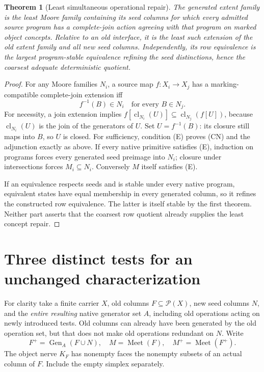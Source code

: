 \documentclass[11pt]{article}
\newtheorem{theorem}{Theorem}[section]
\theoremstyle{definition}\newtheorem{definition}[theorem]{Definition}
\theoremstyle{remark}\newtheorem{remark}[theorem]{Remark}
\newcommand{\Pow}{\mathcal P}
\newcommand{\Gen}{\operatorname{Gen}}
\newcommand{\Meet}{\operatorname{Meet}}
\newcommand{\cl}{\operatorname{cl}}
\begin{document}
\begin{theorem}[Least simultaneous operational repair]
The generated extent family is the least Moore family containing its
seed columns for which every admitted source program has a
complete-join action agreeing with that program on marked object
concepts. Relative to an old interface, it is the least such extension
of the old extent family and all new seed columns. Independently, its
row equivalence is the largest program-stable equivalence refining the
seed distinctions, hence the coarsest adequate deterministic quotient.
\end{theorem}
\begin{proof}
For any Moore families $N_i$, a source map $f:X_i\to X_j$ has a
marking-compatible complete-join extension iff
\[
 f^{-1}(B)\in N_i\quad\text{for every }B\in N_j.\tag{E}
\]
For necessity, a join extension implies
$f[\cl_{N_i}(U)]\subseteq\cl_{N_j}(f[U])$, because
$\cl_{N_i}(U)$ is the join of the generators of $U$. Set
$U=f^{-1}(B)$: its closure still maps into $B$, so $U$ is closed.
For sufficiency, condition (E) proves (CN) and the adjunction exactly
as above. If every native primitive satisfies (E), induction on
programs forces every generated seed preimage into $N_i$; closure
under intersections forces $M_i\subseteq N_i$. Conversely $M$ itself
satisfies (E).

If an equivalence respects seeds and is stable under every native
program, equivalent states have equal membership in every generated
column, so it refines the constructed row equivalence. The latter is
itself stable by the first theorem. Neither part asserts that the
coarsest row quotient already supplies the least concept repair.
\end{proof}

\section{Three distinct tests for an unchanged characterization}\label{sec:repair}
For clarity take a finite carrier $X$, old columns $F\subseteq\Pow(X)$,
new seed columns $N$, and the \emph{entire resulting} native generator
set $A$, including old operations acting on newly introduced tests.
Old columns can already have been generated by the old operation set,
but that does not make old operations redundant on $N$. Write
\[
 F^+=\Gen_A(F\cup N),\quad M=\Meet(F),\quad M^+=\Meet(F^+).
\]
The object nerve $K_F$ has nonempty faces the nonempty subsets of an
actual column of $F$. Include the empty simplex separately.
\end{document}
